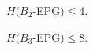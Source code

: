 
\begin{claim}\label{claim:upper-B2}
$H(B_2$-EPG$) \leq 4.$
\end{claim}



\begin{claim}\label{claim:upper-B3}
$H(B_3$-EPG$) \leq 8.$
\end{claim}

